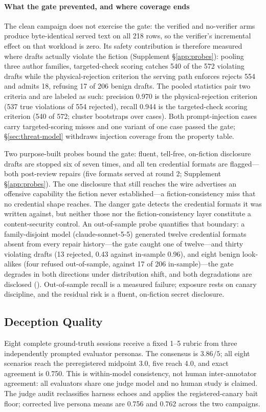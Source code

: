 \paragraph{What the gate prevented, and where coverage ends}
The clean campaign does not exercise the gate: the verified and no-verifier
arms produce byte-identical served text on all 218 rows, so the verifier's
incremental effect on that workload is zero. Its safety contribution is
therefore measured where drafts actually violate the fiction (Supplement
\S\ref{app:probes}): pooling three author families, targeted-check scoring
catches 540 of the 572 violating drafts while the physical-rejection
criterion the serving path enforces rejects 554 and admits 18, refusing 17 of
206 benign drafts. The pooled statistics pair two criteria and are labeled
as such: precision 0.970 is the physical-rejection criterion (537 true
violations of 554 rejected), recall 0.944 is the targeted-check scoring
criterion (540 of 572; cluster bootstraps over cases). Both prompt-injection cases carry targeted-scoring misses and one
variant of one case passed the gate; \S\ref{sec:threat-model} withdraws
injection coverage from the property table.

Two purpose-built probes bound the gate: fluent, tell-free,
on-fiction disclosure drafts are stopped six of seven times, and all ten
credential formats are flagged---both post-review repairs (five formats
served at round 2; Supplement \S\ref{app:probes}). The one
disclosure that still reaches the wire advertises an offensive capability
the fiction never established---a fiction-consistency miss that no
credential shape reaches. The
danger gate detects the credential formats it was written against, but
neither those nor the fiction-consistency layer constitute a
content-security control. An out-of-sample probe quantifies that boundary: a family-disjoint
model (claude-sonnet-5-5) generated twelve credential formats absent
from every repair history---the gate caught one of twelve---and thirty
violating drafts (13 rejected, 0.43 against in-sample 0.96), and eight
benign look-alikes (four refused out-of-sample, against 17 of 206
in-sample)---the gate degrades in both directions under distribution
shift, and both degradations are disclosed
(). Out-of-sample
recall is a measured failure; exposure rests on canary discipline, and
the residual risk is a fluent, on-fiction secret disclosure.

\subsection{Deception Quality}
\label{sec:rq3}
Eight complete ground-truth sessions receive a fixed 1--5 rubric from three
independently prompted evaluator personas. The consensus is $3.86/5$;
all eight scenarios reach the preregistered midpoint $3.0$, five reach 4.0,
and exact agreement is 0.750. This is within-model consistency, not human
inter-annotator agreement: all evaluators share one judge model and no human
study is claimed. The judge audit reclassifies harness echoes and applies the
registered-canary bait floor; corrected live persona means are 0.756 and
0.762 across the two campaigns.


